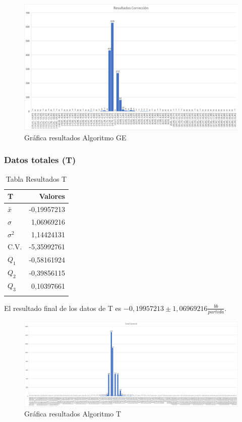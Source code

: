 \vspace{5mm} %

\begin{figure}[h]
\centering
\includegraphics[width=1.3\textwidth, angle=90]{figuras/AGC.png}   
\caption{Gráfica resultados Algoritmo GE}
\label{fig:AGC}
\end{figure}


\subsubsection{Datos totales (T)}

\begin{longtable}[c]{lr}
\hline
T & Valores \\ \hline
$\bar{x}$ & -0,19957213 \\ 
$\sigma$ & 1,06969216 \\ 
$\sigma^2$ & 1,14424131 \\ 
C.V. & -5,35992761 \\ 
$Q_1$ & -0,58161924 \\ 
$Q_2$ & -0,39856115 \\ 
$Q_3$ & 0,10397661 \\ \hline
\caption{Tabla Resultados T}
\label{tab:AGT}
\end{longtable}

\vspace{5mm} %

El resultado final de los datos de T es  $-0,19957213\pm1,06969216$$\frac{bb}{partida}$.

\vspace{5mm} %

\begin{figure}[h]
\centering
\includegraphics[width=1.3\textwidth, angle=90]{figuras/AGT.png}   
\caption{Gráfica resultados Algoritmo T}
\label{fig:AGT}
\end{figure}

